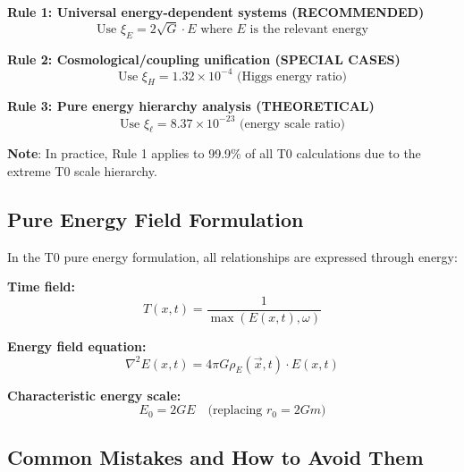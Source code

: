 \documentclass[12pt,a4paper]{article}
\begin{document}
\begin{tcolorbox}[colback=blue!5!white,colframe=blue!75!black,title=Application Rules for $\xi$ Parameters (Pure Energy)]
	\textbf{Rule 1: Universal energy-dependent systems (RECOMMENDED)}
	\begin{equation}
		\text{Use } \xi_E = 2\sqrt{G} \cdot E \text{ where } E \text{ is the relevant energy}
	\end{equation}
	
	\textbf{Rule 2: Cosmological/coupling unification (SPECIAL CASES)}
	\begin{equation}
		\text{Use } \xi_H = 1.32 \times 10^{-4} \text{ (Higgs energy ratio)}
	\end{equation}
	
	\textbf{Rule 3: Pure energy hierarchy analysis (THEORETICAL)}
	\begin{equation}
		\text{Use } \xi_\ell = 8.37 \times 10^{-23} \text{ (energy scale ratio)}
	\end{equation}
	
	\textbf{Note}: In practice, Rule 1 applies to 99.9\% of all T0 calculations due to the extreme T0 scale hierarchy.
\end{tcolorbox}

\subsection{Pure Energy Field Formulation}
\label{subsec:pure_energy_field}

In the T0 pure energy formulation, all relationships are expressed through energy:

\textbf{Time field:}
\begin{equation}
	T(x,t) = \frac{1}{\max(E(x,t), \omega)}
\end{equation}

\textbf{Energy field equation:}
\begin{equation}
	\nabla^2 E(x,t) = 4\pi G \rho_E(\vec{x},t) \cdot E(x,t)
\end{equation}

\textbf{Characteristic energy scale:}
\begin{equation}
	E_0 = 2GE \quad \text{(replacing } r_0 = 2Gm\text{)}
\end{equation}

\subsection{Common Mistakes and How to Avoid Them}
\label{subsec:common_mistakes}
\end{document}
